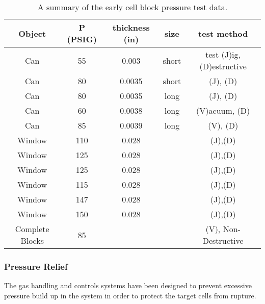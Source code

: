 {\begin{safetyen}{10}{5}
\begin{table}[htb]
\begin{center}
\begin{tabular}{|c|c|c|c|c|} \hline
Object & P (PSIG) & thickness (in) & size & test method \\ \hline
Can & 55  & 0.003 &short &test (J)ig, (D)estructive \\ \hline
Can & 80 & 0.0035 &short &(J), (D) \\ \hline
Can & 80 & 0.0035 &long &(J), (D) \\ \hline
Can & 60 & 0.0038 &long &(V)acuum, (D) \\ \hline
Can & 85 & 0.0039 &long &(V), (D) \\ \hline
Window & 110 &0.028& &(J),(D) \\ \hline
Window & 125 &0.028& &(J),(D) \\ \hline
Window & 125 &0.028& &(J),(D) \\ \hline
Window & 115 &0.028& &(J),(D) \\ \hline
Window & 147 &0.028& &(J),(D) \\ \hline
Window & 150 &0.028& &(J),(D) \\ \hline
Complete Blocks & 85 &&&(V), Non-Destructive \\ \hline
\end{tabular}
\end{center}
\caption[Cryotarget: Cell Pressure Test Data]{A summary of the early cell block pressure test data.}
\label{ta:test}
\end{table}

\subsubsection{ Pressure Relief}

The gas handling and controls systems have been designed to 
prevent excessive pressure build up in the system in order to
protect the target cells from rupture.


\end{safetyen}}
